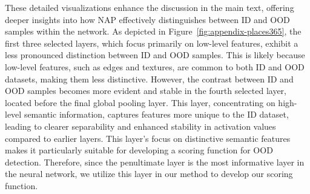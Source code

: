 These detailed visualizations enhance the discussion in the main text, offering deeper insights into how NAP effectively distinguishes between ID and OOD samples within the network. As depicted in Figure~\ref{fig:appendix-places365}, the first three selected layers, which focus primarily on low-level features, exhibit a less pronounced distinction between ID and OOD samples. This is likely because low-level features, such as edges and textures, are common to both ID and OOD datasets, making them less distinctive. However, the contrast between ID and OOD samples becomes more evident and stable in the fourth selected layer, located before the final global pooling layer. This layer, concentrating on high-level semantic information, captures features more unique to the ID dataset, leading to clearer separability and enhanced stability in activation values compared to earlier layers. This layer's focus on distinctive semantic features makes it particularly suitable for developing a scoring function for OOD detection. 
Therefore, since the penultimate layer is the most informative layer in the neural network, we utilize this layer in our method to develop our scoring function.
